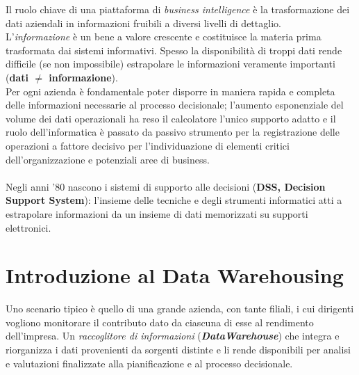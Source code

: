 \documentclass[a4paper, notitlepage, 9pt]{extreport}
\begin{document}
Il ruolo chiave di una piattaforma di \textit{business intelligence} è la trasformazione dei dati aziendali in informazioni fruibili a diversi livelli di dettaglio.\\
L'\textit{informazione} è un bene a valore crescente e costituisce la materia prima trasformata dai sistemi informativi. Spesso la disponibilità di troppi dati rende difficile (se non impossibile) estrapolare le informazioni veramente importanti (\textbf{dati $\neq$ informazione}).\\
Per ogni azienda è fondamentale poter disporre in maniera rapida e completa delle informazioni necessarie al processo decisionale; l'aumento esponenziale del volume dei dati operazionali ha reso il calcolatore l’unico supporto adatto e il ruolo dell’informatica è passato da passivo strumento per la registrazione delle operazioni a fattore decisivo per l'individuazione di elementi critici dell’organizzazione e potenziali aree di business.\\\\
Negli anni '80 nascono i sistemi di supporto alle decisioni (\textbf{DSS, Decision Support System}): l'insieme delle tecniche e degli strumenti informatici atti a estrapolare informazioni da un insieme di dati memorizzati su supporti elettronici.


\section*{Introduzione al Data Warehousing}
Uno scenario tipico è quello di una grande azienda, con tante filiali, i cui dirigenti vogliono monitorare il contributo dato da ciascuna di esse al rendimento dell'impresa. Un \textit{raccoglitore di informazioni} (\textit{\textbf{DataWarehouse}}) che integra e riorganizza i dati provenienti da sorgenti distinte e li rende disponibili per analisi e valutazioni finalizzate alla pianificazione e al processo decisionale.
\end{document}
